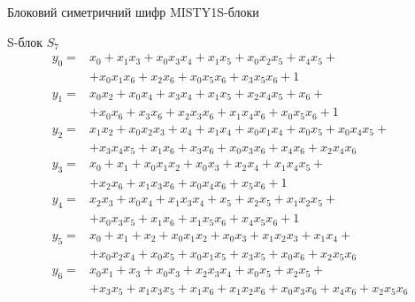 \documentclass[10pt, ucs]{beamer}
\newenvironment{changemargin}[2]{%
\begin{list}{}{%
\setlength{\topsep}{0pt}%
\setlength{\leftmargin}{#1}%
\setlength{\rightmargin}{#2}%
\setlength{\listparindent}{\parindent}%
\setlength{\itemindent}{\parindent}%
\setlength{\parsep}{\parskip}%
}%
\item[]}{\end{list}}
\begin{document}
\begin{frame}{Блоковий симетричний шифр MISTY1}{S-блоки}
    \begin{changemargin}{-2cm}{-2cm}
        \small
        \begin{block}{S-блок $S_7$}
            \begin{equation}
                \nonumber
                \label{eqn:misty-s7}
                \begin{array}{ll}
                    y_0 =& x_0 + x_1 x_3 + x_0 x_3 x_4 + x_1 x_5 + x_0 x_2 x_5 + x_4 x_5 + \\
                    & + x_0 x_1 x_6 + x_2 x_6 + x_0 x_5 x_6 + x_3 x_5 x_6 + 1 \\
                    y_1 =& x_0 x_2 + x_0 x_4 +x_3 x_4 +x_1 x_5 + x_2 x_4 x_5 +x_6 + \\
                    & + x_0 x_6 +x_3 x_6 +x_2 x_3 x_6 + x_1 x_4 x_6 + x_0 x_5 x_6 +1 \\
                    y_2 =& x_1 x_2 + x_0 x_2 x_3 + x_4 + x_1 x_4 + x_0 x_1 x_4 + x_0 x_5 + x_0 x_4 x_5 + \\
                    & + x_3 x_4 x_5 + x_1 x_6 + x_3 x_6 + x_0 x_3 x_6 + x_4 x_6 + x_2 x_4 x_6 \\
                    y_3 =& x_0 + x_1 + x_0 x_1 x_2 + x_0 x_3 + x_2 x_4 + x_1 x_4 x_5 + \\
                    & + x_2 x_6 + x_1 x_3 x_6 + x_0 x_4 x_6 + x_5 x_6 + 1 \\ 
                    y_4 =& x_2 x_3 + x_0 x_4 + x_1 x_3 x_4 + x_5 + x_2 x_5 + x_1 x_2 x_5 + \\
                    & + x_0 x_3 x_5 + x_1 x_6 + x_1 x_5 x_6 + x_4 x_5 x_6 + 1 \\
                    y_5 =& x_0 + x_1 + x_2 + x_0 x_1 x_2 + x_0 x_3 + x_1 x_2 x_3 + x_1 x_4 + \\
                    & + x_0 x_2 x_4 + x_0 x_5 + x_0 x_1 x_5 + x_3 x_5 + x_0 x_6 + x_2 x_5 x_6 \\
                    y_6 =& x_0 x_1 + x_3 + x_0 x_3 + x_2 x_3 x_4 + x_0 x_5 + x_2 x_5 + \\
                    & + x_3 x_5 + x_1 x_3 x_5 + x_1 x_6 + x_1 x_2 x_6 + x_0 x_3 x_6 + x_4 x_6 + x_2 x_5 x_6 \\
                \end{array}
            \end{equation}
        \end{block}
    \end{changemargin}
\end{frame}
\end{document}
